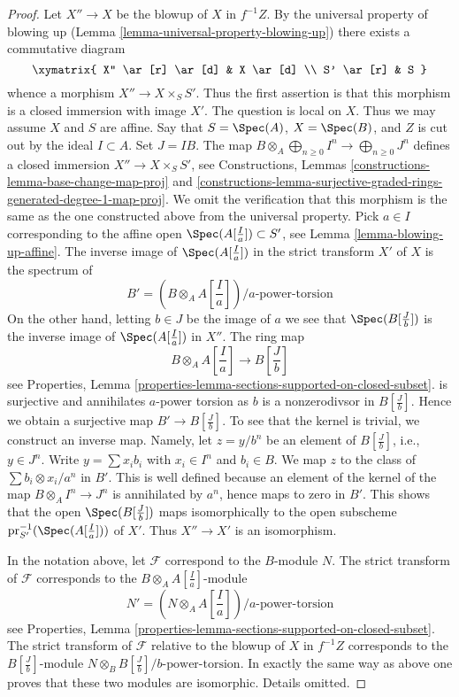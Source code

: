 \begin{proof}
Let $X'' \to X$ be the blowup of $X$ in $f^{-1}Z$. By the universal
property of blowing up (Lemma \ref{lemma-universal-property-blowing-up})
there exists a commutative diagram
$$
\xymatrix{
X'' \ar[r] \ar[d] & X \ar[d] \\
S' \ar[r] & S
}
$$
whence a morphism $X'' \to X \times_S S'$. Thus the first assertion
is that this morphism is a closed immersion with image $X'$.
The question is local on $X$. Thus we may assume $X$
and $S$ are affine. Say that $S = \Spec(A)$, $X = \Spec(B)$, and $Z$
is cut out by the ideal $I \subset A$. Set $J = IB$. The map
$B \otimes_A \bigoplus_{n \geq 0} I^n \to \bigoplus_{n \geq 0} J^n$
defines a closed immersion $X'' \to X \times_S S'$, see
Constructions, Lemmas
\ref{constructions-lemma-base-change-map-proj} and
\ref{constructions-lemma-surjective-graded-rings-generated-degree-1-map-proj}.
We omit the verification that this morphism is the same as the
one constructed above from the universal property.
Pick $a \in I$ corresponding to the affine open
$\Spec(A[\frac{I}{a}]) \subset S'$, see Lemma \ref{lemma-blowing-up-affine}.
The inverse image of $\Spec(A[\frac{I}{a}])$ in the strict transform
$X'$ of $X$ is the spectrum of
$$
B' = (B \otimes_A A[\textstyle{\frac{I}{a}}])/a\text{-power-torsion}
$$
On the other hand, letting $b \in J$ be the image of $a$ we see that
$\Spec(B[\frac{J}{b}])$ is the inverse image of $\Spec(A[\frac{I}{a}])$
in $X''$. The ring map
$$
B \otimes_A A[\textstyle{\frac{I}{a}}]
\longrightarrow
B[\textstyle{\frac{J}{b}}]
$$
see Properties, Lemma
\ref{properties-lemma-sections-supported-on-closed-subset}.
is surjective and annihilates $a$-power torsion as $b$ is a nonzerodivsor
in $B[\frac{J}{b}]$. Hence we obtain a surjective map $B' \to B[\frac{J}{b}]$.
To see that the kernel is trivial, we construct an inverse map. Namely, let
$z = y/b^n$ be an element of $B[\frac{J}{b}]$, i.e., $y \in J^n$.
Write $y = \sum x_ib_i$ with $x_i \in I^n$ and $b_i \in B$.
We map $z$ to the class of $\sum b_i \otimes x_i/a^n$ in
$B'$. This is well defined because an element of the kernel of the map
$B \otimes_A I^n \to J^n$ is annihilated by $a^n$, hence maps to zero in $B'$.
This shows that the open $\Spec(B[\frac{J}{b}])$ maps isomorphically
to the open subscheme $\text{pr}_{S'}^{-1}(\Spec(A[\frac{I}{a}]))$ of $X'$.
Thus $X'' \to X'$ is an isomorphism.

\medskip\noindent
In the notation above, let $\mathcal{F}$ correspond to the $B$-module $N$.
The strict transform of $\mathcal{F}$ corresponds to the
$B \otimes_A A[\frac{I}{a}]$-module
$$
N' = (N \otimes_A A[\textstyle{\frac{I}{a}}])/a\text{-power-torsion}
$$
see Properties, Lemma
\ref{properties-lemma-sections-supported-on-closed-subset}.
The strict transform of $\mathcal{F}$ relative to the blowup of
$X$ in $f^{-1}Z$ corresponds to the $B[\frac{J}{b}]$-module
$N \otimes_B B[\frac{J}{b}]/b\text{-power-torsion}$. In exactly the same
way as above one proves that these two modules are isomorphic.
Details omitted.
\end{proof}

